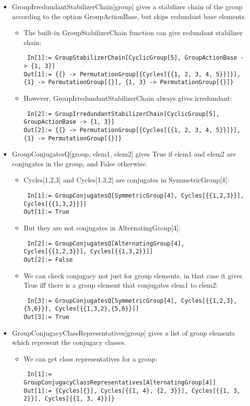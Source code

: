 \begin{itemize}
\item GroupIrredundantStabilizerChain[group] gives a stabilizer chain of the group according to the option GroupActionBase, but skips redundant base elements.
\begin{itemize}
\item The built-in GroupStabilizerChain function can give redundant stabilizer chain:
\begin{lstlisting}
 In[1]:= GroupStabilizerChain[CyclicGroup[5], GroupActionBase -> {1, 3}]
Out[1]:= {{} -> PermutationGroup[{Cycles[{{1, 2, 3, 4, 5}}]}], {1} -> PermutationGroup[{}], {1, 3} -> PermutationGroup[{}]}
\end{lstlisting}
\item However, GroupIrredundantStabilizerChain always gives irredundant:
\begin{lstlisting}
 In[2]:= GroupIrredundantStabilizerChain[CyclicGroup[5], GroupActionBase -> {1, 3}]
Out[2]:= {{} -> PermutationGroup[{Cycles[{{1, 2, 3, 4, 5}}]}], {1} -> PermutationGroup[{}]}
\end{lstlisting}
\end{itemize}

\item GroupConjugatesQ[group, elem1, elem2] gives True if elem1 and elem2 are conjugates in the group, and False otherwise.
\begin{itemize}
\item Cycles[{{1,2,3}}] and Cycles[{{1,3,2}}] are conjugates in SymmetricGroup[4]:
\begin{lstlisting}
 In[1]:= GroupConjugatesQ[SymmetricGroup[4], Cycles[{{1,2,3}}], Cycles[{{1,3,2}}]]
Out[1]:= True
\end{lstlisting}
\item But they are not conjugates in AlternatingGroup[4]:
\begin{lstlisting}
 In[2]:= GroupConjugatesQ[AlternatingGroup[4], Cycles[{{1,2,3}}], Cycles[{{1,3,2}}]]
Out[2]:= False
\end{lstlisting}
\item We can check conjugacy not just for group elements, in that case it gives True iff there is a group element that conjugates elem1 to elem2:
\begin{lstlisting}
 In[3]:= GroupConjugatesQ[SymmetricGroup[4], Cycles[{{1,2,3},{5,6}}], Cycles[{{1,3,2},{5,6}}]]
Out[3]:= True
\end{lstlisting}
\end{itemize}

\item GroupConjugacyClassRepresentatives[group] gives a list of group elements which represent the conjugacy classes.
\begin{itemize}
\item We can get class representatives for a group:
\begin{lstlisting}
 In[1]:= GroupConjugacyClassRepresentatives[AlternatingGroup[4]]
Out[1]:= {Cycles[{}], Cycles[{{1, 4}, {2, 3}}], Cycles[{{1, 3, 2}}], Cycles[{{1, 3, 4}}]}
\end{lstlisting}
\end{itemize}


\end{itemize}
